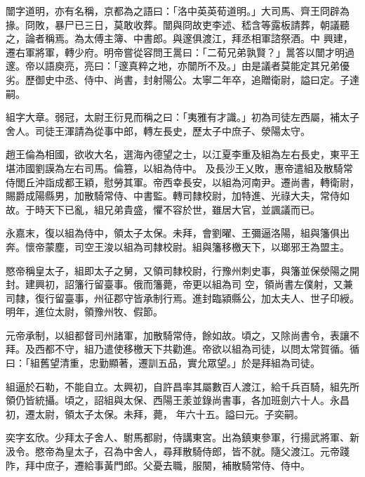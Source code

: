 \begin{pinyinscope}
 闓字道明，亦有名稱，京都為之語曰：「洛中英英荀道明。」大司馬、齊王冏辟為掾。冏敗，暴尸已三日，莫敢收葬。闓與冏故吏李述、嵇含等露板請葬，朝議聽之，論者稱焉。為太傅主簿、中書郎。與邃俱渡江，拜丞相軍諮祭酒。中
 興建，遷右軍將軍，轉少府。明帝嘗從容問王暠曰：「二荀兄弟孰賢？」暠答以闓才明過邃。帝以語庾亮，亮曰：「邃真粹之地，亦闓所不及。」由是議者莫能定其兄弟優劣。歷御史中丞、侍中、尚書，封射陽公。太寧二年卒，追贈衛尉，謚曰定。子達嗣。



 組字大章。弱冠，太尉王衍見而稱之曰：「夷雅有才識。」初為司徒左西屬，補太子舍人。司徒王渾請為從事中郎，轉左長史，歷太子中庶子、滎陽太守。



 趙王倫為相國，欲收大名，選海內德望之士，以江夏李重及組為左右長史，東平王堪沛國劉謨為左右司馬。倫篡，以組為侍中。
 及長沙王乂敗，惠帝遣組及散騎常侍閭丘沖詣成都王穎，慰勞其軍。帝西幸長安，以組為河南尹。遷尚書，轉衛尉，賜爵成陽縣男，加散騎常侍、中書監。轉司隸校尉，加特進、光祿大夫，常侍如故。于時天下已亂，組兄弟貴盛，懼不容於世，雖居大官，並諷議而已。



 永嘉末，復以組為侍中，領太子太保。未拜，會劉曜、王彌逼洛陽，組與籓俱出奔。懷帝蒙塵，司空王浚以組為司隸校尉。組與籓移檄天下，以瑯邪王為盟主。



 愍帝稱皇太子，組即太子之舅，又領司隸校尉，行豫州刺史事，與籓並保滎陽之開封。建興初，詔籓行留臺事。俄而籓薨，帝更以組為司
 空，領尚書左僕射，又兼司隸，復行留臺事，州征郡守皆承制行焉。進封臨潁縣公，加太夫人、世子印綬。明年，進位太尉，領豫州牧、假節。



 元帝承制，以組都督司州諸軍，加散騎常侍，餘如故。頃之，又除尚書令，表讓不拜。及西都不守，組乃遣使移檄天下共勸進。帝欲以組為司徒，以問太常賀循。循曰：「組舊望清重，忠勤顯著，遷訓五品，實允眾望。」於是拜組為司徒。



 組逼於石勒，不能自立。太興初，自許昌率其屬數百人渡江，給千兵百騎，組先所領仍皆統攝。頃之，詔組與太保、西陽王羕並錄尚書事，各加班劍六十人。永昌初，遷太尉，領太子太保。未拜，薨，
 年六十五。謚曰元。子奕嗣。



 奕字玄欣。少拜太子舍人、駙馬都尉，侍講東宮。出為鎮東參軍，行揚武將軍、新汲令。愍帝為皇太子，召為中舍人，尋拜散騎侍郎，皆不就。隨父渡江。元帝踐阼，拜中庶子，遷給事黃門郎。父憂去職，服闋，補散騎常侍、侍中。




\end{pinyinscope}
